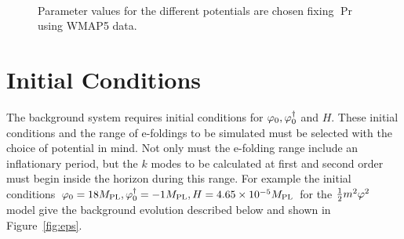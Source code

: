 \begin{figure}
{}\\%
\caption[Parameter values for different potentials]{Parameter values for the
different potentials are chosen fixing $\Pr$ using WMAP5 data.}
\label{fig:params-num}
\end{figure}


\section{Initial Conditions} 
\label{sec:initconds-num}

The background system requires initial conditions for $\varphi_{0},
\varphi_{0}^{\dagger}$ and $H$. These initial conditions and the range of
e-foldings to be simulated must be selected with the choice of
potential in mind. Not only must the
e-folding range include an inflationary period, but the $k$ modes to
be calculated at first and second order must begin inside the horizon
during this range. For example the initial conditions $\varphi_0 = 18M_{\mathrm{PL}},
\varphi_0^{\dagger} = -1 M_{\mathrm{PL}}, H = 4.65\times 10^{-5}M_{\mathrm{PL}}$ for the $\frac{1}{2} m^2 \varphi^2$ model 
give the background evolution described below and shown in Figure~\ref{fig:eps}.


